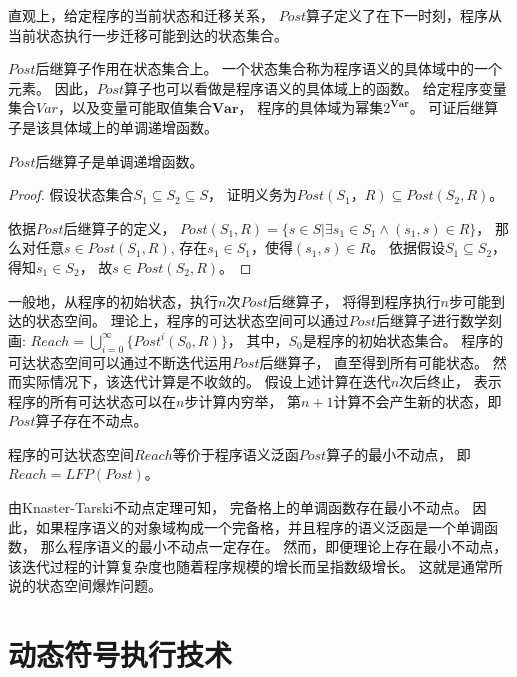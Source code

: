 直观上，给定程序的当前状态和迁移关系，
$Post$算子定义了在下一时刻，程序从当前状态执行一步迁移可能到达的状态集合。

$Post$后继算子作用在状态集合上。
一个状态集合称为程序语义的具体域中的一个元素。
因此，$Post$算子也可以看做是程序语义的具体域上的函数。
给定程序变量集合$Var$，以及变量可能取值集合$\textbf{Var}$，
程序的具体域为幂集$2^{\textbf{Var}}$。
可证后继算子是该具体域上的单调递增函数。

\begin{lemma}
$Post$后继算子是单调递增函数。
\end{lemma}

\begin{proof}
	假设状态集合$S_1 \subseteq S_2 \subseteq S$，
	证明义务为$Post(S_1， R) \subseteq Post(S_2,R)$。
	
	依据$Post$后继算子的定义，
	$Post(S_1, R) = \{ s\in S | \exists s_1 \in S_1 \wedge (s_1, s)\in R \}$，
	那么对任意$s\in Post(S_1, R)$,
	存在$s_1\in S_1$，使得$(s_1, s)\in R$。
	依据假设$S_1 \subseteq S_2$，得知$s_1 \in S_2$，
	故$s\in Post(S_2, R)$。
\end{proof}


一般地，从程序的初始状态，执行$n$次$Post$后继算子，
将得到程序执行$n$步可能到达的状态空间。
理论上，程序的可达状态空间可以通过$Post$后继算子进行数学刻画:
$Reach = \bigcup_{i=0}^{\infty}\{Post^{i}(S_0, R)\}$，
其中，$S_0$是程序的初始状态集合。
程序的可达状态空间可以通过不断迭代运用$Post$后继算子，
直至得到所有可能状态。
然而实际情况下，该迭代计算是不收敛的。
假设上述计算在迭代$n$次后终止，
表示程序的所有可达状态可以在$n$步计算内穷举，
第$n+1$计算不会产生新的状态，即$Post$算子存在不动点。


\begin{lemma}
程序的可达状态空间$Reach$等价于程序语义泛函$Post$算子的最小不动点，
即$Reach = LFP(Post)$。
\end{lemma}

由Knaster-Tarski不动点定理可知，	完备格上的单调函数存在最小不动点。
因此，如果程序语义的对象域构成一个完备格，并且程序的语义泛函是一个单调函数，
那么程序语义的最小不动点一定存在。
然而，即便理论上存在最小不动点，
该迭代过程的计算复杂度也随着程序规模的增长而呈指数级增长。
这就是通常所说的状态空间爆炸问题。

\section{动态符号执行技术}

